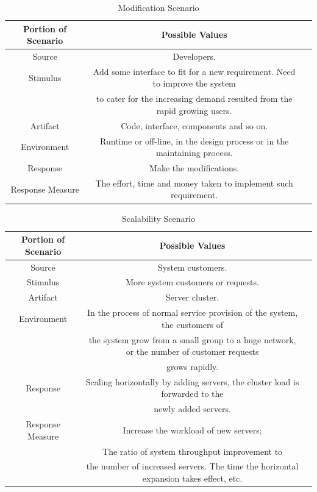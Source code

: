 \documentclass{article}
\begin{document}
	\begin{center}
		\begin{table}[!htb]
		\begin{tabular}{ccc}
		\toprule  
		Portion of Scenario & Possible Values\\
		\midrule 
		Source & Developers.\\
		Stimulus & Add some interface to fit for a new requirement. Need to improve the system \\
		& to cater for the increasing demand resulted from the rapid growing users.\\
		Artifact & Code, interface, components and so on.\\
		Environment & Runtime or off-line, in the design process or in the maintaining process.\\
		Response & Make the modifications.\\
		Response Measure & The effort, time and money taken to implement such requirement.\\
		\bottomrule
		\end{tabular}
		\caption{Modification Scenario}
		\end{table}
	\end{center}

	\begin{center}
		\begin{table}[!htb]
		\begin{tabular}{ccc}
		\toprule  
		Portion of Scenario & Possible Values\\
		\midrule 
		Source & System customers.\\
		Stimulus & More system customers or requests.\\
		Artifact & Server cluster.\\
		Environment & In the process of normal service provision of the system, the customers of \\
		& the system grow from a small group to a huge network, or the number of customer requests \\
		& grows rapidly.\\
		Response & Scaling horizontally by adding servers, the cluster load is forwarded to the \\
		& newly added servers.\\
		Response Measure & Increase the workload of new servers; \\
		& The ratio of system throughput improvement to \\
		& the number of increased servers. The time the horizontal expansion takes effect, etc.\\
		\bottomrule
		\end{tabular}
		\caption{Scalability Scenario}
		\end{table}
	\end{center}
\end{document}
